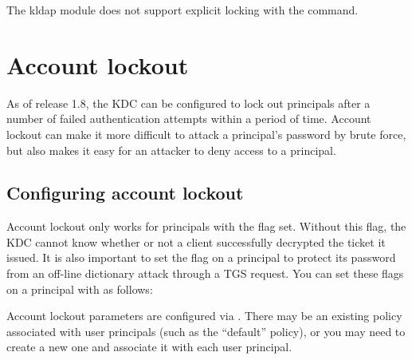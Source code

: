 \documentclass[letterpaper,10pt,english]{sphinxmanual}
\begin{document}
The kldap module does not support explicit locking with the
{\hyperref[\detokenize{admin/admin_commands/kadmin_local:kadmin-1}]{}}  command.


\chapter{Account lockout}
\label{\detokenize{admin/lockout:lockout}}\label{\detokenize{admin/lockout::doc}}\label{\detokenize{admin/lockout:account-lockout}}
As of release 1.8, the KDC can be configured to lock out principals
after a number of failed authentication attempts within a period of
time.  Account lockout can make it more difficult to attack a
principal’s password by brute force, but also makes it easy for an
attacker to deny access to a principal.


\section{Configuring account lockout}
\label{\detokenize{admin/lockout:configuring-account-lockout}}
Account lockout only works for principals with the
 flag set.  Without this flag, the KDC cannot
know whether or not a client successfully decrypted the ticket it
issued.  It is also important to set the  flag on a
principal to protect its password from an off-line dictionary attack
through a TGS request.  You can set these flags on a principal with
{\hyperref[\detokenize{admin/admin_commands/kadmin_local:kadmin-1}]{}} as follows:

%
\begin{sphinxVerbatim}[commandchars=\\\{\}]
    
\end{sphinxVerbatim}

Account lockout parameters are configured via {\hyperref[\detokenize{admin/database:policies}]{}}.  There may be an existing policy associated with user
principals (such as the “default” policy), or you may need to create a
new one and associate it with each user principal.
\end{document}
